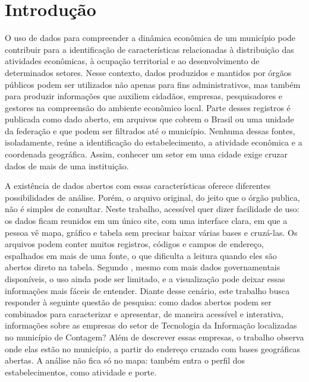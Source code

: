 
\section{Introdução}

O uso de dados para compreender a dinâmica econômica de um município pode contribuir para a identificação de características relacionadas à distribuição das atividades econômicas, à ocupação territorial e ao desenvolvimento de determinados setores.
Nesse contexto, dados produzidos e mantidos por órgãos públicos podem ser utilizados não apenas para fins administrativos, mas também para produzir informações que auxiliem cidadãos, empresas, pesquisadores e gestores na compreensão do ambiente econômico local.
Parte desses registros é publicada como dado aberto, em arquivos que cobrem o Brasil ou uma unidade da federação e que podem ser filtrados até o município.
Nenhuma dessas fontes, isoladamente, reúne a identificação do estabelecimento, a atividade econômica e a coordenada geográfica.
Assim, conhecer um setor em uma cidade exige cruzar dados de mais de uma instituição.

A existência de dados abertos com essas características oferece diferentes possibilidades de análise. Porém, o arquivo original, do jeito que o órgão publica, não é simples de consultar.
Neste trabalho, acessível quer dizer facilidade de uso: os dados ficam reunidos em um único site, com uma interface clara, em que a pessoa vê mapa, gráfico e tabela sem precisar baixar várias bases e cruzá-las.
Os arquivos podem conter muitos registros, códigos e campos de endereço, espalhados em mais de uma fonte, o que dificulta a leitura quando eles são abertos direto na tabela.
Segundo , mesmo com mais dados governamentais disponíveis, o uso ainda pode ser limitado, e a visualização pode deixar essas informações mais fáceis de entender.
Diante desse cenário, este trabalho busca responder à seguinte questão de pesquisa: como dados abertos podem ser combinados para caracterizar e apresentar, de maneira acessível e interativa, informações sobre as empresas do setor de Tecnologia da Informação localizadas no município de Contagem?
Além de descrever essas empresas, o trabalho observa onde elas estão no município, a partir do endereço cruzado com bases geográficas abertas.
A análise não fica só no mapa: também entra o perfil dos estabelecimentos, como atividade e porte.


